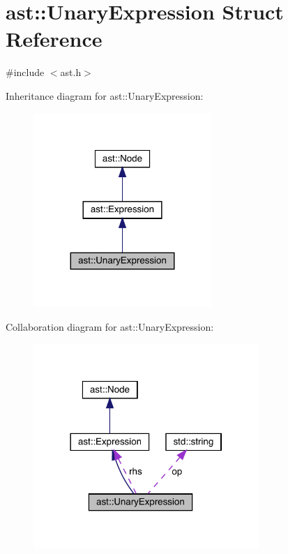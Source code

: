 \hypertarget{structast_1_1_unary_expression}{}\section{ast\+:\+:Unary\+Expression Struct Reference}
\label{structast_1_1_unary_expression}


{\ttfamily \#include $<$ast.\+h$>$}



Inheritance diagram for ast\+:\+:Unary\+Expression\+:\nopagebreak
\begin{figure}[H]
\begin{center}
\leavevmode
\includegraphics[width=191pt]{structast_1_1_unary_expression__inherit__graph}
\end{center}
\end{figure}


Collaboration diagram for ast\+:\+:Unary\+Expression\+:\nopagebreak
\begin{figure}[H]
\begin{center}
\leavevmode
\includegraphics[width=242pt]{structast_1_1_unary_expression__coll__graph}
\end{center}
\end{figure}
